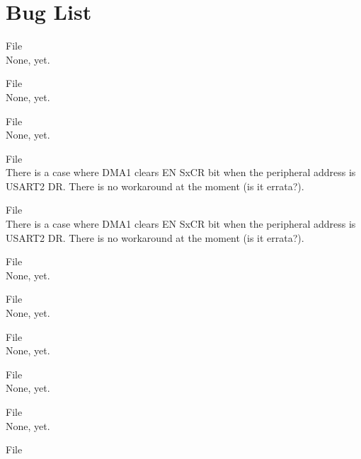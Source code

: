 \chapter{Bug List}
\hypertarget{bug}{}\label{bug}

\begin{DoxyRefList}
\item[File \doxylink{adc_8c}{adc.c} ]\hfill \\
\label{bug__bug000002}%
%
None, yet.  
\item[File \doxylink{adc_8h}{adc.h} ]\hfill \\
\label{bug__bug000003}%
%
None, yet.  
\item[File \doxylink{defines_8h}{defines.h} ]\hfill \\
\label{bug__bug000001}%
%
None, yet.  
\item[File \doxylink{dma_8c}{dma.c} ]\hfill \\
\label{bug__bug000004}%
%
There is a case where DMA1 clears EN Sx\+CR bit when the peripheral address is USART2 DR. There is no workaround at the moment (is it errata?).  
\item[File \doxylink{dma_8h}{dma.h} ]\hfill \\
\label{bug__bug000005}%
%
There is a case where DMA1 clears EN Sx\+CR bit when the peripheral address is USART2 DR. There is no workaround at the moment (is it errata?).  
\item[File \doxylink{gpio_8c}{gpio.c} ]\hfill \\
\label{bug__bug000006}%
%
None, yet.  
\item[File \doxylink{gpio_8h}{gpio.h} ]\hfill \\
\label{bug__bug000007}%
%
None, yet.  
\item[File \doxylink{interrupts_8c}{interrupts.c} ]\hfill \\
\label{bug__bug000008}%
%
None, yet.  
\item[File \doxylink{interrupts_8h}{interrupts.h} ]\hfill \\
\label{bug__bug000009}%
%
None, yet.  
\item[File \doxylink{main_8c}{main.c} ]\hfill \\
\label{bug__bug000014}%
%
None, yet.  
\item[File \doxylink{mcu__init_8c}{mcu\+\_\+init.c} ]\hfill \\

\end{DoxyRefList}
